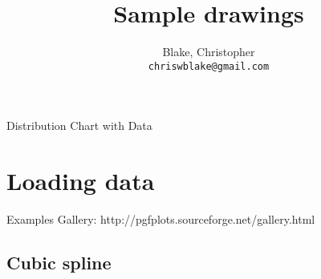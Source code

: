 \documentclass{article}
\begin{document}
\author{
  Blake, Christopher\\
  \texttt{chriswblake@gmail.com}
}

\title{Sample drawings}
\maketitle

Distribution Chart with Data

\newcommand{\bin}[5]{
    \draw [gray!25] (0,0) rectangle (10,1);

    \draw [gray] (#1, 0.8) -- (#1, 0.05); \node [black] at (#1, 0.9) {$Low$};
    \draw [gray] (#2, 0.8) -- (#2, 0.05); \node [black] at (#2, 0.9) {$High$};

    \draw [gray, thick, dashed] plot [smooth] coordinates {
        (#3, 0.3) (#3+1, 0.4)
        (#4, 0.8)
        (#5-1, 0.4) (#5, 0.3)};

    \draw [gray] (#3, 0.2) -- (#3, 0.4); \node [black] at (#3, 0.1) {$-N\sigma$};
    \draw [gray] (#4, 0.2) -- (#4, 0.95); \node [black] at (#4, 0.1) {$\mu$};
    \draw [gray] (#5, 0.2) -- (#5, 0.4); \node [black] at (#5, 0.1) {$+N\sigma$};
}




\section{Loading data}
    Examples Gallery: http://pgfplots.sourceforge.net/gallery.html
    
    \subsection{Cubic spline}
\end{document}
